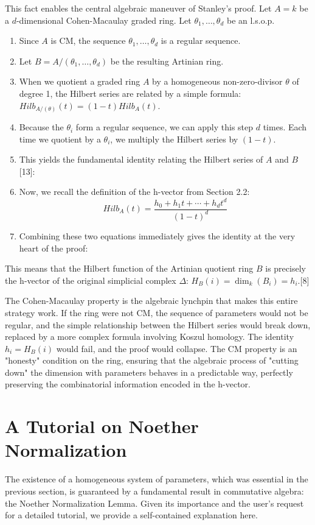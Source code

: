 \documentclass[11pt]{article}
\begin{document}
This fact enables the central algebraic maneuver of Stanley's proof. Let $A = k$ be a $d$-dimensional Cohen-Macaulay graded ring. Let $\theta_1, \ldots, \theta_d$ be an l.s.o.p.
\begin{enumerate}
    \item Since $A$ is CM, the sequence $\theta_1, \ldots, \theta_d$ is a regular sequence.
    \item Let $B = A/(\theta_1, \ldots, \theta_d)$ be the resulting Artinian ring.
    \item When we quotient a graded ring $A$ by a homogeneous non-zero-divisor $\theta$ of degree 1, the Hilbert series are related by a simple formula: $Hilb_{A/(\theta)}(t) = (1-t) Hilb_A(t)$.
    \item Because the $\theta_i$ form a regular sequence, we can apply this step $d$ times. Each time we quotient by a $\theta_i$, we multiply the Hilbert series by $(1-t)$.
    \item This yields the fundamental identity relating the Hilbert series of $A$ and $B$ [13]:
    \
    \item Now, we recall the definition of the h-vector from Section 2.2:
    \[Hilb_A(t) = \frac{h_0 + h_1 t + \cdots + h_d t^d}{(1-t)^d}\]
    \item Combining these two equations immediately gives the identity at the very heart of the proof:
    \
\end{enumerate}
This means that the Hilbert function of the Artinian quotient ring $B$ is precisely the h-vector of the original simplicial complex $\Delta$: $H_B(i) = \dim_k(B_i) = h_i$.[8]

The Cohen-Macaulay property is the algebraic lynchpin that makes this entire strategy work. If the ring were not CM, the sequence of parameters would not be regular, and the simple relationship between the Hilbert series would break down, replaced by a more complex formula involving Koszul homology. The identity $h_i = H_B(i)$ would fail, and the proof would collapse. The CM property is an "honesty" condition on the ring, ensuring that the algebraic process of "cutting down" the dimension with parameters behaves in a predictable way, perfectly preserving the combinatorial information encoded in the h-vector.

\section{A Tutorial on Noether Normalization}

The existence of a homogeneous system of parameters, which was essential in the previous section, is guaranteed by a fundamental result in commutative algebra: the Noether Normalization Lemma. Given its importance and the user's request for a detailed tutorial, we provide a self-contained explanation here.
\end{document}
